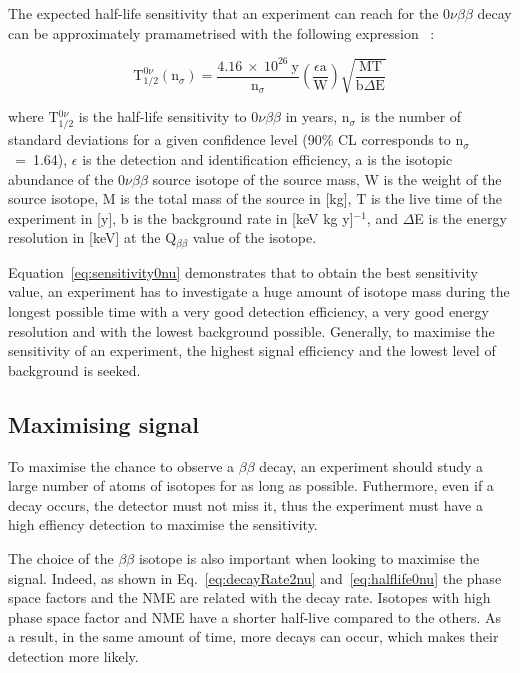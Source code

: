 \documentclass[main.tex]{subfiles}
\begin{document}
\NI The expected half-life sensitivity that an experiment can reach for the 0$\nu\beta\beta$ decay can be approximately pramametrised with the following expression~\cite{formulaSensBB} : 


\begin{equation}\label{eq:sensitivity0nu}
\text{T}_{\text{1/2}}^{0\nu} (\text{n}_\sigma) = \frac{\text{4.16}~\times~\text{10}^{\text{26}}~\text{y}}{\text{n}_\sigma} \left(\frac{\epsilon \text{a}}{\text{W}} \right) \sqrt{\frac{\text{MT}}{\text{b}\Delta\text{E}}}
\end{equation}


\bigskip


\NI where T$_{\text{1/2}}^{0\nu}$ is the half-life sensitivity to 0$\nu\beta\beta$ in years, n$_\sigma$ is the number of standard deviations for a given confidence level (90\% CL corresponds to n$_\sigma$~=~1.64), $\epsilon$ is the detection and identification efficiency, a is the isotopic abundance of the 0$\nu\beta\beta$ source isotope of the source mass, W is the weight of the source isotope, M is the total mass of the source in [kg], T is the live time of the experiment in [y], b is the background rate in [keV kg y]$^{-\text{1}}$, and $\Delta$E is the energy resolution in [keV] at the Q$_{\beta\beta}$ value of the isotope. 


\bigskip


\NI Equation~\ref{eq:sensitivity0nu} demonstrates that to obtain the best sensitivity value, an experiment has to investigate a huge amount of isotope mass during the longest possible time with a very good detection efficiency, a very good energy resolution and with the lowest background possible. Generally, to maximise the sensitivity of an experiment, the highest signal efficiency and the lowest level of background is seeked.


\subsection{Maximising signal}


\NI To maximise the chance to observe a $\beta\beta$ decay, an experiment should study a large number of atoms of isotopes for as long as possible. Futhermore, even if a decay occurs, the detector must not miss it, thus the experiment must have a high effiency detection to maximise the sensitivity.


\bigskip

\NI The choice of the $\beta\beta$ isotope is also important when looking to maximise the signal. Indeed, as shown in Eq.~\ref{eq:decayRate2nu} and~\ref{eq:halflife0nu} the phase space factors and the NME are related with the decay rate. Isotopes with high phase space factor and NME have a shorter half-live compared to the others. As a result, in the same amount of time, more decays can occur, which makes their detection more likely. 
\end{document}

